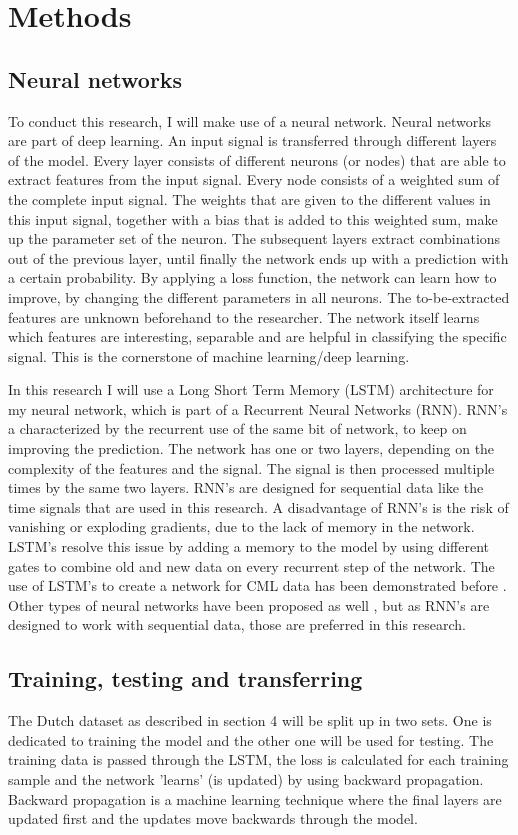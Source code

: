 \documentclass[twocolumn, 10pt, a4paper]{article}
\begin{document}
	\section{Methods}
	\subsection{Neural networks}
	To conduct this research, I will make use of a neural network. Neural networks are part of deep learning. An input signal is transferred through different layers of the model. Every layer consists of different neurons (or nodes) that are able to extract features from the input signal. Every node consists of a weighted sum of the complete input signal. The weights that are given to the different values in this input signal, together with a bias that is added to this weighted sum, make up the parameter set of the neuron. 
	The subsequent layers extract combinations out of the previous layer, until finally the network ends up with a prediction with a certain probability. By applying a loss function, the network can learn how to improve, by changing the different parameters in all neurons. The to-be-extracted features are unknown beforehand to the researcher. The network itself learns which features are interesting, separable and are helpful in classifying the specific signal. This is the cornerstone of machine learning/deep learning. 
	
	In this research I will use a Long Short Term Memory (LSTM) architecture for my neural network, which is part of a Recurrent Neural Networks (RNN). RNN's a characterized by the recurrent use of the same bit of network, to keep on improving the prediction. The network has one or two layers, depending on the complexity of the features and the signal. The signal is then processed multiple times by the same two layers. RNN's are designed for sequential data like the time signals that are used in this research. A disadvantage of RNN's is the risk of vanishing or exploding gradients, due to the lack of memory in the network. LSTM's resolve this issue by adding a memory to the model by using different gates to combine old and new data on every recurrent step of the network. The use of LSTM's to create a network for CML data has been demonstrated before \cite{Habi2019, Diba2021, Pudashine2020}. Other types of neural networks have been proposed as well \cite{Polz2020}, but as RNN's are designed to work with sequential data, those are preferred in this research.
	
	\subsection{Training, testing and transferring}
	The  Dutch dataset as described in section 4 will be split up in two sets. One is dedicated to training the model and the other one will be used for testing. The training data is passed through the LSTM, the loss is calculated for each training sample and the network 'learns' (is updated) by using backward propagation. Backward propagation is a machine learning technique where the final layers are updated first and the updates move backwards through the model. 
	
\end{document}

